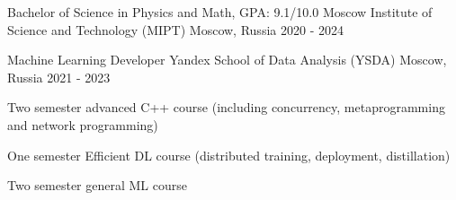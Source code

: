 
\begin{cventries}
  \cventry
    {Bachelor of Science in Physics and Math, GPA: 9.1/10.0} %
    {Moscow Institute of Science and Technology (MIPT)} %
    {Moscow, Russia} %
    {2020 - 2024} %
    {}
    
  \cventry
    {Machine Learning Developer}
    {Yandex School of Data Analysis (YSDA)}
    {Moscow, Russia}
    {2021 - 2023}
    {
       \begin{cvitems} %
        \item {Two semester advanced C++ course (including concurrency, metaprogramming and network programming)}
        \item {One semester Efficient DL course (distributed training, deployment, distillation)}
        \item {Two semester general ML course}
      \end{cvitems}
    }
\end{cventries}

